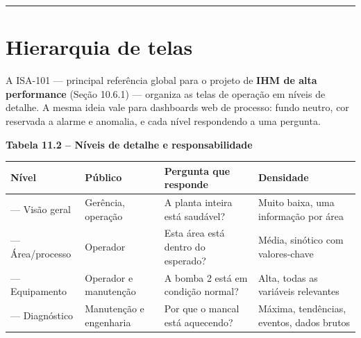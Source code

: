 \begin{center}\rule{0.5\linewidth}{0.5pt}\end{center}

\section{Hierarquia de telas}\label{hierarquia-de-telas}

A ISA-101 --- principal referência global para o projeto de \textbf{IHM de alta performance} (Seção 10.6.1) --- organiza as telas de operação em níveis de detalhe. A mesma ideia vale para dashboards web de processo: fundo neutro, cor reservada a alarme e anomalia, e cada nível respondendo a uma pergunta.

\textbf{Tabela 11.2 -- Níveis de detalhe e responsabilidade}

\begin{longtable}[]{@{}
  >{\raggedright\arraybackslash}p{}
  >{\raggedright\arraybackslash}p{}
  >{\raggedright\arraybackslash}p{}
  >{\raggedright\arraybackslash}p{}@{}}
\toprule\noalign{}
\begin{minipage}[b]{\linewidth}\raggedright
Nível
\end{minipage} & \begin{minipage}[b]{\linewidth}\raggedright
Público
\end{minipage} & \begin{minipage}[b]{\linewidth}\raggedright
Pergunta que responde
\end{minipage} & \begin{minipage}[b]{\linewidth}\raggedright
Densidade
\end{minipage} \\
\midrule\noalign{}
\endhead
\bottomrule\noalign{}
\endlastfoot
1 --- Visão geral & Gerência, operação & A planta inteira está saudável? & Muito baixa, uma informação por área \\
2 --- Área/processo & Operador & Esta área está dentro do esperado? & Média, sinótico com valores-chave \\
3 --- Equipamento & Operador e manutenção & A bomba 2 está em condição normal? & Alta, todas as variáveis relevantes \\
4 --- Diagnóstico & Manutenção e engenharia & Por que o mancal está aquecendo? & Máxima, tendências, eventos, dados brutos \\
\end{longtable}


